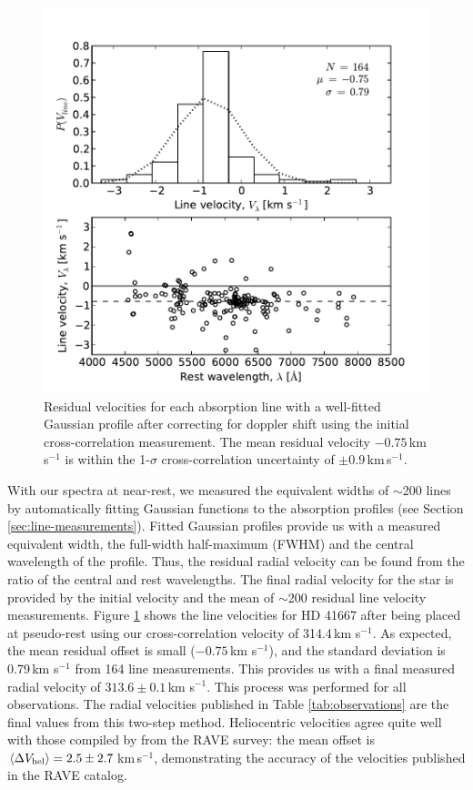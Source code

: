 \documentclass{emulateapj}
\begin{document}
\begin{figure}[h!]
	\includegraphics[width=\columnwidth]{./figures/line-velocity.pdf}
	\caption{Residual velocities for each absorption line with a well-fitted Gaussian profile after correcting for doppler shift using the initial cross-correlation measurement. The mean residual velocity $-0.75$\,km\,s$^{-1}$ is within the 1-$\sigma$ cross-correlation uncertainty of $\pm0.9$\,km\,s$^{-1}$.}
	\label{fig:line-velocities}
\end{figure}

With our spectra at near-rest, we measured the equivalent widths of $\sim$200 lines by automatically fitting Gaussian functions to the absorption profiles (see Section \ref{sec:line-measurements}). Fitted Gaussian profiles provide us with a measured equivalent width, the full-width half-maximum (FWHM) and the central wavelength of the profile. Thus, the residual radial velocity can be found from the ratio of the central and rest wavelengths. The final radial velocity for the star is provided by the initial velocity and the mean of $\sim$200 residual line velocity measurements. Figure \ref{fig:line-velocities} shows the line velocities for HD 41667 after being placed at pseudo-rest using our cross-correlation velocity of 314.4\,km s$^{-1}$. As expected, the mean residual offset is small ($-0.75$\,km s$^{-1}$), and the standard deviation is 0.79\,km s$^{-1}$ from 164 line measurements. This provides us with a final measured radial velocity of $313.6 \pm 0.1$\,km s$^{-1}$. This process was performed for all observations. The radial velocities published in Table \ref{tab:observations} are the final values from this two-step method. Heliocentric velocities agree quite well with those compiled by \citet{williams;et-al_2011} from the RAVE survey: the mean offset is $\langle\Delta{V_{\rm hel}}\rangle = 2.5 \pm 2.7$\,km\,s$^{-1}$, demonstrating the accuracy of the velocities published in the RAVE catalog.
\end{document}
